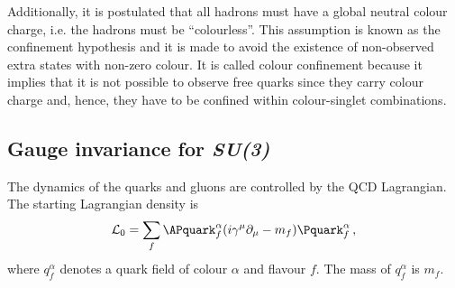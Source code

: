 Additionally, it is postulated that all hadrons must have a global neutral colour charge, i.e. the hadrons must be ``colourless''. This assumption is known as  the
confinement hypothesis and it is made to avoid the existence of non-observed extra states with non-zero colour. It is called colour confinement because it implies
that it is not possible to observe free quarks since they carry colour charge and, hence, they have to be confined within colour-singlet combinations.



\subsection{Gauge invariance for \textit{SU(3)}}%
The dynamics of the quarks and gluons are controlled by the QCD Lagrangian. %
The starting Lagrangian density is
\begin{equation}\label{eq:chap1:QCD:Lagrangian_0}
\mathcal{L}_{0} = \sum_{f} \APquark_{f}^{\alpha} (i \gamma^{\mu} \partial_{\mu} - m_{f})\Pquark_{f}^{\alpha}\, ,
\end{equation}
where $q^{\alpha}_{f}$ denotes a quark field of colour $\alpha$ and flavour $f$. The mass
of $q^{\alpha}_{f}$ is $m_f$. 

